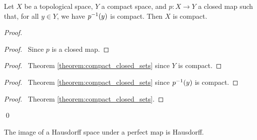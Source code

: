 \begin{proposition}
    \label{proposition:compact_pre_image}
    Let $X$ be a topological space, $Y$ a compact space, and $p : X \rightarrow Y$ a closed map such that, for all $y \in Y$, we have ${p}^{-1}(y)$ is compact. Then $X$ is compact.
\end{proposition}

\begin{proof}
    \pf
    \begin{proof}
        \pf\ Since $p$ is a closed map.
    \end{proof}
    \begin{proof}
        \pf\ Theorem \ref{theorem:compact_closed_sets} since $Y$ is compact.
    \end{proof}
    \begin{proof}
        \pf\ Theorem \ref{theorem:compact_closed_sets} since ${p}^{-1}(y)$ is compact.
    \end{proof}
    \qedstep
    \begin{proof}
        \pf\ Theorem \ref{theorem:compact_closed_sets}.
    \end{proof}
    \qed
\end{proof}

\begin{proposition}
    \label{proposition:perfect_image_Hausdorff}
    The image of a Hausdorff space under a perfect map is Hausdorff.
\end{proposition}

